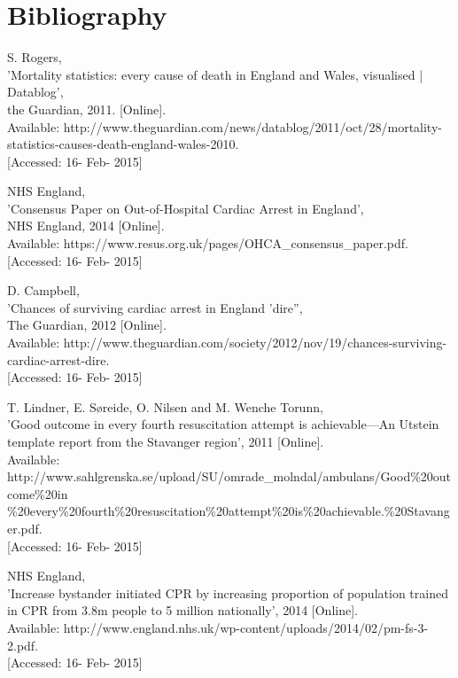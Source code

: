 \documentclass[]{article}
\begin{document}
\section{Bibliography}
\begin{enumerate}[label={[\arabic*]}]

\item S. Rogers,\\
'Mortality statistics: every cause of death in England and Wales, visualised | Datablog',\\
the Guardian, 2011. [Online].\\
Available: http://www.theguardian.com/news/datablog/2011/oct/28/mortality-statistics-causes-death-england-wales-2010. \\{}
[Accessed: 16- Feb- 2015]

\item NHS England,\\ 'Consensus Paper on Out-of-Hospital Cardiac Arrest in England',\\ NHS England, 2014 [Online].\\ Available: https://www.resus.org.uk/pages/OHCA\_consensus\_paper.pdf.\\{} [Accessed: 16- Feb- 2015]

\item D. Campbell,\\ 'Chances of surviving cardiac arrest in England 'dire'',\\ The Guardian, 2012 [Online]. \\Available: http://www.theguardian.com/society/2012/nov/19/chances-surviving-cardiac-arrest-dire.\\{} [Accessed: 16- Feb- 2015]

\item T. Lindner, E. Søreide, O. Nilsen and M. Wenche Torunn,\\ 'Good outcome in every fourth resuscitation attempt is achievable—An Utstein template report from the Stavanger region', 2011 [Online]. \\Available: http://www.sahlgrenska.se/upload/SU/omrade\_molndal/ambulans/Good\%20outcome\%20in
\%20every\%20fourth\%20resuscitation\%20attempt\%20is\%20achievable.\%20Stavanger.pdf. \\{}[Accessed: 16- Feb- 2015]

\item NHS England, \\'Increase bystander initiated CPR by increasing proportion of population trained in CPR from 3.8m people to 5 million nationally', 2014 [Online].\\ Available: http://www.england.nhs.uk/wp-content/uploads/2014/02/pm-fs-3-2.pdf. \\{}[Accessed: 16- Feb- 2015]


\end{enumerate}
\end{document}
